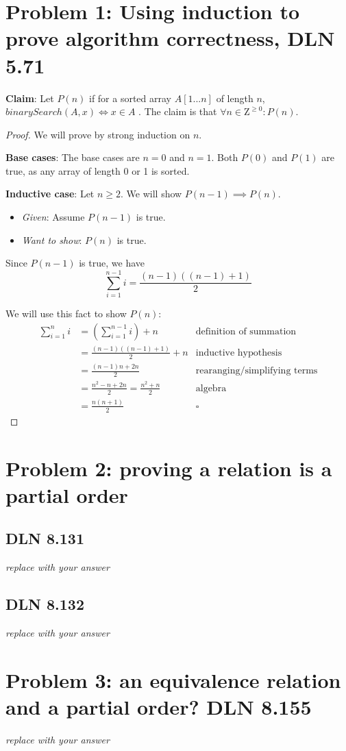 \documentclass[titlepage]{article}
\begin{document}
 \maketitle

\section{Problem 1: Using induction to prove algorithm correctness, DLN 5.71}

\textbf{Claim}: Let $P(n)$ if for a sorted array $A[1...n]$ of length $n$, $binarySearch(A, x) \iff x \in A$ .  The claim is that $\forall n \in \mathrm{Z}^{\geq 0}: P(n)$.

\begin{proof}
We will prove by strong induction on $n$.

\textbf{Base cases}: The base cases are $n=0$ and $n=1$. Both $P(0)$ and $P(1)$ are true, as any array of length 0 or 1 is sorted.


\textbf{Inductive case}: Let $n \geq 2$.  We will show $P(n-1) \implies P(n)$.
\begin{itemize}
\item \emph{Given}: Assume $P(n-1)$ is true.
\item \emph{Want to show}: $P(n)$ is true.
\end{itemize}
Since $P(n-1)$ is true, we have
$$\sum_{i=1}^{n-1} i = \frac{(n-1)((n-1)+1)}{2}$$

We will use this fact to show $P(n)$:
\begin{align*}
\sum_{i=1}^{n} i &= \left( \sum_{i=1}^{n-1} i \right) + n & \text{definition of summation} \\
&= \frac{(n-1)((n-1)+1)}{2} + n & \text{inductive hypothesis} \\
&= \frac{(n-1)n + 2n}{2} & \text{rearanging/simplifying terms} \\
&= \frac{n^2 - n + 2n}{2} = \frac{n^2 + n}{2}  & \text{algebra} \\
&= \frac{n(n + 1)}{2}  & \square
\end{align*}
\end{proof}

\section{Problem 2: proving a relation is a partial order}

\subsection{DLN 8.131}

\emph{replace with your answer}

\subsection{DLN 8.132}

\emph{replace with your answer}

\section{Problem 3: an equivalence relation and a partial order? DLN 8.155}

\emph{replace with your answer}
\end{document}

